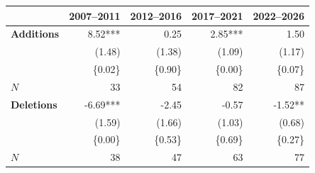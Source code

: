 \begin{tabular}{lrrrr}
\toprule
 & 2007–2011 & 2012–2016 & 2017–2021 & 2022–2026 \\
\midrule
\textbf{Additions} & 8.52*** & 0.25 & 2.85*** & 1.50 \\
 & (1.48) & (1.38) & (1.09) & (1.17) \\
 & \{0.02\} & \{0.90\} & \{0.00\} & \{0.07\} \\
$N$ & 33 & 54 & 82 & 87 \\
\addlinespace
\textbf{Deletions} & -6.69*** & -2.45 & -0.57 & -1.52** \\
 & (1.59) & (1.66) & (1.03) & (0.68) \\
 & \{0.00\} & \{0.53\} & \{0.69\} & \{0.27\} \\
$N$ & 38 & 47 & 63 & 77 \\
\bottomrule
\end{tabular}
